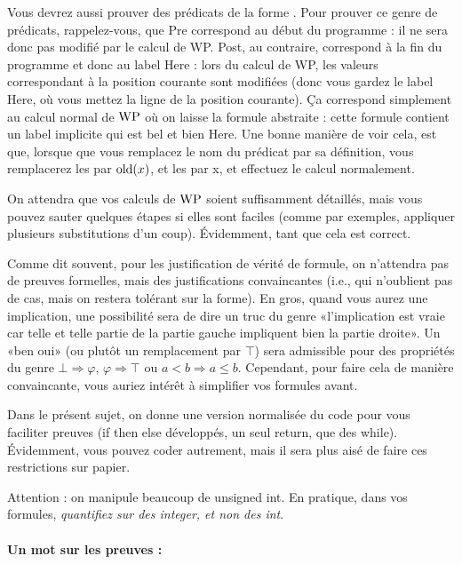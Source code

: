 \documentclass[11pt,answers]{exam}
\begin{document}
Vous devrez aussi prouver des prédicats de la forme .
Pour prouver ce genre de prédicats, rappelez-vous, que Pre correspond au début du programme : il ne sera donc pas modifié par le calcul de WP. Post, au contraire, correspond à la fin du programme et donc au label Here : lors du calcul de WP, les valeurs correspondant à la position courante sont modifiées (donc vous gardez le label Here, où vous mettez la ligne de la position courante). Ça correspond simplement au calcul normal de $\mathrm{WP}$ où on laisse la formule abstraite : cette formule contient un label implicite qui est bel et bien Here.
Une bonne manière de voir cela, est que, lorsque que vous remplacez le nom du prédicat par sa définition, vous remplacerez les  par $\mathrm{old}(x)$, et les  par x, et effectuez le calcul normalement.

On attendra que vos calculs de $\mathrm{WP}$ soient suffisamment détaillés, mais vous pouvez sauter quelques étapes si elles sont faciles (comme par exemples, appliquer plusieurs substitutions d’un coup). Évidemment, tant que cela est correct.

Comme dit souvent, pour les justification de vérité de formule, on n’attendra pas de preuves formelles, mais des justifications convaincantes (i.e., qui n’oublient pas de cas, mais on restera tolérant sur la forme).
En gros, quand vous aurez une implication, une possibilité sera de dire un truc du genre «l’implication est vraie car telle et telle partie de la partie gauche impliquent bien la partie droite».
Un «ben oui» (ou plutôt un remplacement par $\top$) sera admissible pour des propriétés du genre $\bot \Rightarrow \varphi$, $\varphi \Rightarrow \top$ ou $a < b \Rightarrow a \leq b$.
Cependant, pour faire cela de manière convaincante, vous auriez intérêt à simplifier vos formules avant.

Dans le présent sujet, on donne une version normalisée du code pour vous faciliter
preuves (if then else développés, un seul return, que des while). Évidemment, vous pouvez
coder autrement, mais il sera plus aisé de faire ces restrictions sur papier.

Attention : on manipule beaucoup de unsigned int. En pratique, dans vos formules, \emph{quantifiez sur des integer, et non des int}.

\paragraph{Un mot sur les preuves :}
\end{document}
